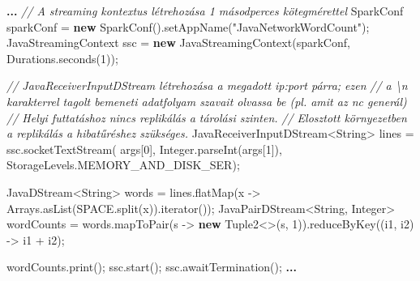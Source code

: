 \documentclass[
]{article}
\newenvironment{Shaded}{}{}
\newcommand{\BuiltInTok}[1]{\textcolor[rgb]{0.00,0.50,0.00}{#1}}
\newcommand{\CommentTok}[1]{\textcolor[rgb]{0.38,0.63,0.69}{\textit{#1}}}
\newcommand{\DecValTok}[1]{\textcolor[rgb]{0.25,0.63,0.44}{#1}}
\newcommand{\FunctionTok}[1]{\textcolor[rgb]{0.02,0.16,0.49}{#1}}
\newcommand{\KeywordTok}[1]{\textcolor[rgb]{0.00,0.44,0.13}{\textbf{#1}}}
\newcommand{\NormalTok}[1]{#1}
\newcommand{\OperatorTok}[1]{\textcolor[rgb]{0.40,0.40,0.40}{#1}}
\newcommand{\StringTok}[1]{\textcolor[rgb]{0.25,0.44,0.63}{#1}}
\begin{document}
\begin{Shaded}
\begin{Highlighting}[]
\KeywordTok{...}
\CommentTok{// A streaming kontextus létrehozása 1 másodperces kötegmérettel}
\NormalTok{SparkConf sparkConf }\OperatorTok{=} \KeywordTok{new} \FunctionTok{SparkConf}\OperatorTok{().}\FunctionTok{setAppName}\OperatorTok{(}\StringTok{"JavaNetworkWordCount"}\OperatorTok{);}
\NormalTok{JavaStreamingContext ssc }\OperatorTok{=} \KeywordTok{new} \FunctionTok{JavaStreamingContext}\OperatorTok{(}\NormalTok{sparkConf}\OperatorTok{,}\NormalTok{ Durations}\OperatorTok{.}\FunctionTok{seconds}\OperatorTok{(}\DecValTok{1}\OperatorTok{));}

\CommentTok{// JavaReceiverInputDStream létrehozása a megadott ip:port párra; ezen}
\CommentTok{// a \textbackslash{}n karakterrel tagolt bemeneti adatfolyam szavait olvassa be (pl. amit az \textquotesingle{}nc\textquotesingle{} generál)}
\CommentTok{// Helyi futtatáshoz nincs replikálás a tárolási szinten.}
\CommentTok{// Elosztott környezetben a replikálás a hibatűréshez szükséges.}
\NormalTok{JavaReceiverInputDStream}\OperatorTok{\textless{}}\BuiltInTok{String}\OperatorTok{\textgreater{}}\NormalTok{ lines }\OperatorTok{=}\NormalTok{ ssc}\OperatorTok{.}\FunctionTok{socketTextStream}\OperatorTok{(}
\NormalTok{        args}\OperatorTok{[}\DecValTok{0}\OperatorTok{],} \BuiltInTok{Integer}\OperatorTok{.}\FunctionTok{parseInt}\OperatorTok{(}\NormalTok{args}\OperatorTok{[}\DecValTok{1}\OperatorTok{]),}\NormalTok{ StorageLevels}\OperatorTok{.}\FunctionTok{MEMORY\_AND\_DISK\_SER}\OperatorTok{);}

\NormalTok{JavaDStream}\OperatorTok{\textless{}}\BuiltInTok{String}\OperatorTok{\textgreater{}}\NormalTok{ words }\OperatorTok{=}\NormalTok{ lines}\OperatorTok{.}\FunctionTok{flatMap}\OperatorTok{(}\NormalTok{x }\OperatorTok{{-}\textgreater{}}
                                \BuiltInTok{Arrays}\OperatorTok{.}\FunctionTok{asList}\OperatorTok{(}\NormalTok{SPACE}\OperatorTok{.}\FunctionTok{split}\OperatorTok{(}\NormalTok{x}\OperatorTok{)).}\FunctionTok{iterator}\OperatorTok{());}
\NormalTok{JavaPairDStream}\OperatorTok{\textless{}}\BuiltInTok{String}\OperatorTok{,} \BuiltInTok{Integer}\OperatorTok{\textgreater{}}\NormalTok{ wordCounts }\OperatorTok{=}
\NormalTok{        words}\OperatorTok{.}\FunctionTok{mapToPair}\OperatorTok{(}\NormalTok{s }\OperatorTok{{-}\textgreater{}} \KeywordTok{new}\NormalTok{ Tuple2}\OperatorTok{\textless{}\textgreater{}(}\NormalTok{s}\OperatorTok{,} \DecValTok{1}\OperatorTok{)).}\FunctionTok{reduceByKey}\OperatorTok{((}\NormalTok{i1}\OperatorTok{,}\NormalTok{ i2}\OperatorTok{)} \OperatorTok{{-}\textgreater{}}\NormalTok{ i1 }\OperatorTok{+}\NormalTok{ i2}\OperatorTok{);}

\NormalTok{wordCounts}\OperatorTok{.}\FunctionTok{print}\OperatorTok{();}
\NormalTok{ssc}\OperatorTok{.}\FunctionTok{start}\OperatorTok{();}
\NormalTok{ssc}\OperatorTok{.}\FunctionTok{awaitTermination}\OperatorTok{();}
\KeywordTok{...}
\end{Highlighting}
\end{Shaded}
\end{document}
